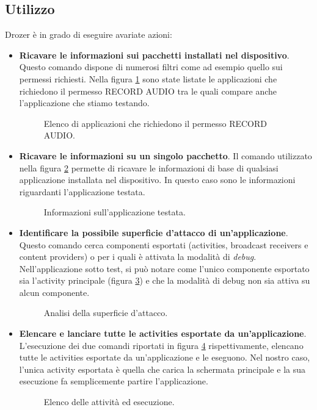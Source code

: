 \subsection{Utilizzo}
Drozer è in grado di eseguire avariate azioni:
\begin{itemize}
	\item \textbf{Ricavare le informazioni sui pacchetti installati nel dispositivo}. Questo comando dispone di numerosi filtri come ad esempio quello sui permessi richiesti. Nella figura \ref{fig:drozerList} sono state listate le applicazioni che richiedono il permesso RECORD AUDIO tra le quali compare anche l'applicazione che stiamo testando.
	\begin{figure}[h]
		\centering 
		\caption{Elenco di applicazioni che richiedono il permesso RECORD AUDIO.}
		\label{fig:drozerList}
	\end{figure}

	\item \textbf{Ricavare le informazioni su un singolo pacchetto}. Il comando utilizzato nella figura \ref{fig:appInfo} permette di ricavare le informazioni di base di qualsiasi applicazione installata nel dispositivo. In questo caso sono le informazioni riguardanti l'applicazione testata.
	\begin{figure}[h]
		\centering 
		\caption{Informazioni sull'applicazione testata.}
		\label{fig:appInfo}
	\end{figure}

	\item \textbf{Identificare la possibile superficie d'attacco di un'applicazione}. Questo comando cerca componenti esportati (activities, broadcast receivers e content providers) o per i quali è attivata la modalità di \emph{debug}. Nell'applicazione sotto test, si può notare come l'unico componente esportato sia l'activity principale (figura \ref{fig:attackSurface}) e che la modalità di debug non sia attiva su alcun componente.
	\begin{figure}[h]
		\centering 
		\caption{Analisi della superficie d'attacco.}
		\label{fig:attackSurface}
	\end{figure}

	\item \textbf{Elencare e lanciare tutte le activities esportate da un'applicazione}. L'esecuzione dei due comandi riportati in figura \ref{fig:activities} rispettivamente, elencano tutte le activities esportate da un'applicazione e le eseguono. Nel nostro caso, l'unica activity esportata è quella che carica la schermata principale e la sua esecuzione fa semplicemente partire l'applicazione. 
	\begin{figure}[h]
		\centering 
		\caption{Elenco delle attività ed esecuzione.}
		\label{fig:activities}
	\end{figure}


\end{itemize}
